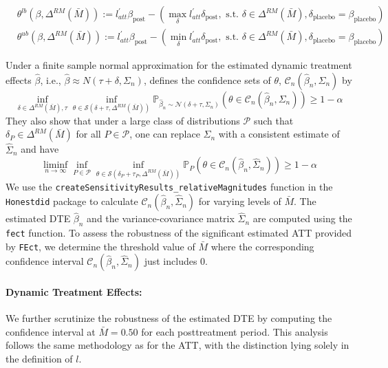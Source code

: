 \documentclass[12pt]{article}
\begin{document}
\[\begin{aligned}
& \theta^{l b}(\beta, \Delta^{RM}(\bar{M})):=l_{att}^{\prime} \beta_{\text {post}}-\left(\max _\delta l_{att}^{\prime} \delta_{\text {post}}, \text { s.t. } \delta \in \Delta^{RM}(\bar{M}), \delta_{\text {placebo}}=\beta_{\text {placebo}}\right) \\
& \theta^{u b}(\beta, \Delta^{RM}(\bar{M})):=l_{att}^{\prime} \beta_{\text {post}}-\left(\min _\delta l_{att}^{\prime} \delta_{\text {post}}, \text { s.t. } \delta \in \Delta^{RM}(\bar{M}), \delta_{\text {placebo}}=\beta_{\text {placebo}}\right)
\end{aligned}\]

\noindent Under a finite sample normal approximation for the estimated dynamic treatment effects $\hat{\beta}$, i.e., $\hat{\beta} \approx N(\tau+\delta,\Sigma_{n})$, \citet{rambachan2023more} defines the confidence sets of $\theta$, $\mathcal{C}_n\left(\hat{\beta}_n, \Sigma_n\right)$ by \[\inf _{\delta \in \Delta^{RM}(\bar{M}), \tau} \inf _{\theta \in \mathcal{S}(\delta+\tau, \Delta^{RM}(\bar{M}))} \mathbb{P}_{\hat{\beta}_n \sim \mathcal{N}\left(\delta+\tau, \Sigma_n\right)}\left(\theta \in \mathcal{C}_n\left(\hat{\beta}_n, \Sigma_n\right)\right) \geq 1-\alpha\] \noindent They also show that under a large class of distributions $\mathcal{P}$ such that $\delta_P \in \Delta^{RM}(\bar{M})$ for all $P \in \mathcal{P}$, one can replace $\Sigma_{n}$ with a consistent estimate of $\hat{\Sigma}_{n}$ and have \[\liminf _{n \rightarrow \infty} \inf _{P \in \mathcal{P}} \inf _{\theta \in \mathcal{S}\left(\delta_P+\tau_P, \Delta^{RM}(\bar{M})\right)} \mathbb{P}_P\left(\theta \in \mathcal{C}_n\left(\hat{\beta}_n, \hat{\Sigma}_n\right)\right) \geq 1-\alpha\]
We use the \texttt{createSensitivityResults\_relativeMagnitudes} function in the \texttt{Honestdid} package to calculate \( \mathcal{C}_n(\hat{\beta}_n, \hat{\Sigma}_n) \) for varying levels of \( \bar{M} \). The estimated DTE \( \hat{\beta}_n \) and the variance-covariance matrix \( \hat{\Sigma}_n \) are computed using the \texttt{fect} function. To assess the robustness of the significant estimated ATT provided by \texttt{FEct}, we determine the threshold value of \( \bar{M} \) where the corresponding confidence interval \( \mathcal{C}_n(\hat{\beta}_n, \hat{\Sigma}_n) \) just includes 0.

\paragraph*{Dynamic Treatment Effects:} We further scrutinize the robustness of the estimated DTE by computing the confidence interval at \( \bar{M}=0.50 \) for each posttreatment period. This analysis follows the same methodology as for the ATT, with the distinction lying solely in the definition of $l$.
\end{document}
